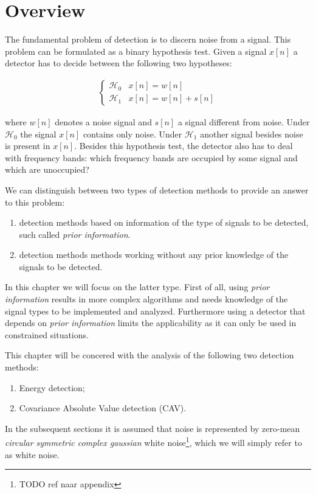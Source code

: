 \documentclass[a4paper, openany, oneside]{memoir}
\begin{document}
\section{Overview}

The fundamental problem of detection is to discern noise from a signal. This problem can be formulated as a binary hypothesis test. Given a signal $x[n]$ a detector has to decide between the following two hypotheses:

\begin{align*}
	\begin{cases}
		\mathcal{H}_0 & x[n] = w[n] \\
		\mathcal{H}_1 & x[n] = w[n] + s[n]
	\end{cases}
\end{align*}

where $w[n]$ denotes a noise signal and $s[n]$ a signal different from noise. Under $\mathcal{H}_0$ the signal $x[n]$ contains only noise. Under $\mathcal{H}_1$ another signal besides noise is present in $x[n]$. Besides this hypothesis test, the detector also has to deal with frequency bands: which frequency bands are occupied by some signal and which are unoccupied?

We can distinguish between two types of detection methods to provide an answer to this problem:
\begin{enumerate}
\item detection methods based on information of the type of signals to be detected, such called \emph{prior information}.
\item detection methods methods working without any prior knowledge of the signals to be detected.
\end{enumerate}

In this chapter we will focus on the latter type. First of all, using \emph{prior information} results in more complex algorithms and needs knowledge of the signal types to be implemented and analyzed. Furthermore using a detector that depends on \emph{prior information} limits the applicability as it can only be used in constrained situations. 

This chapter will be concered with the analysis of the following two detection methods:

\begin{enumerate}
	\item Energy detection;
	\item Covariance Absolute Value detection (CAV).
\end{enumerate}

In the subsequent sections it is assumed that noise is represented  by zero-mean \emph{circular symmetric complex gaussian} white noise\footnote{TODO ref naar appendix}, which we will simply refer to as white noise.  
\end{document}
